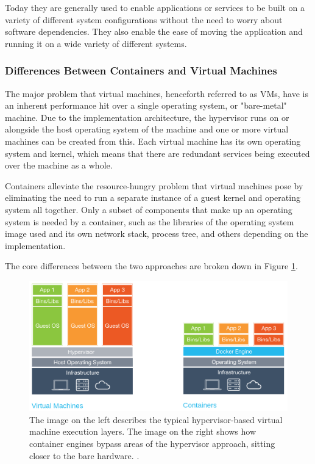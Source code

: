 Today they are generally used to enable applications or services to be built on a variety of different system configurations without the need to worry about software dependencies. They also enable the ease of moving the application and running it on a wide variety of different systems.

\subsubsection{Differences Between Containers and Virtual Machines}

The major problem that virtual machines, henceforth referred to as VMs, have is an inherent performance hit over a single operating system, or "bare-metal" machine. Due to the implementation architecture, the hypervisor runs on or alongside the host operating system of the machine and one or more virtual machines can be created from this. Each virtual machine has its own operating system and kernel, which means that there are redundant services being executed over the machine as a whole.

Containers alleviate the resource-hungry problem that virtual machines pose by eliminating the need to run a separate instance of a guest kernel and operating system all together. Only a subset of components that make up an operating system is needed by a container, such as the libraries of the operating system image used and its own network stack, process tree, and others depending on the implementation.

The core differences between the two approaches are broken down in Figure \ref{fig:hypecont_diff}.


\begin{figure}[h!]
\centering
\includegraphics[width=\textwidth]{Figures/hypervisor_vs_container.png}
\decoRule
\caption[Differences between Hypervisors and Containers]{The image on the left describes the typical hypervisor-based virtual machine execution layers. The image on the right shows how container engines bypass areas of the hypervisor approach, sitting closer to the bare hardware. \parencite{enterprise_hypercont_diff}.}
\label{fig:hypecont_diff}
\end{figure}


